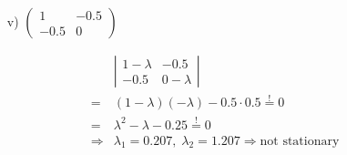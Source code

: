 \documentclass[12pt,a4paper]{article}
\begin{document}
\begin{itemize}
    \item[v)] $ \begin{pmatrix}
    1 & -0.5 \\ 
    -0.5 & 0
    \end{pmatrix} $
\end{itemize}

\begin{align*}
  & \left|
  \begin{matrix}
    1 - \lambda & -0.5 \\ 
    -0.5 &  0 - \lambda
    \end{matrix}
    \right| \\
    = & (1 - \lambda)( - \lambda) - 0.5 \cdot 0.5 \overset{!}{=} 0 \\
    = & \lambda^2 - \lambda - 0.25 \overset{!}{=} 0\\
    \Rightarrow & \lambda_1 = 0.207, \; \lambda_2 = 1.207 \Rightarrow \text{not stationary} 
\end{align*}
\end{document}
